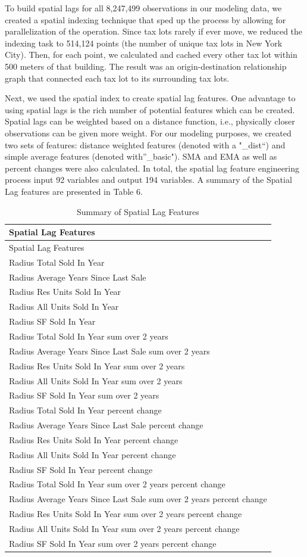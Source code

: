 \documentclass[12pt,]{article}
\begin{document}
To build spatial lags for all 8,247,499 observations in our modeling
data, we created a spatial indexing technique that sped up the process
by allowing for parallelization of the operation. Since tax lots rarely
if ever move, we reduced the indexing task to 514,124 points (the number
of unique tax lots in New York City). Then, for each point, we
calculated and cached every other tax lot within 500 meters of that
building. The result was an origin-destination relationship graph that
connected each tax lot to its surrounding tax lots.

Next, we used the spatial index to create spatial lag features. One
advantage to using spatial lags is the rich number of potential features
which can be created. Spatial lags can be weighted based on a distance
function, i.e., physically closer observations can be given more weight.
For our modeling purposes, we created two sets of features: distance
weighted features (denoted with a "\_dist``) and simple average features
(denoted with''\_basic"). SMA and EMA as well as percent changes were
also calculated. In total, the spatial lag feature engineering process
input 92 variables and output 194 variables. A summary of the Spatial
Lag features are presented in Table 6.

\begin{longtable}[]{@{}l@{}}
\caption{Summary of Spatial Lag Features}\tabularnewline
\toprule
Spatial Lag Features\tabularnewline
\midrule
\endfirsthead
\toprule
Spatial Lag Features\tabularnewline
\midrule
\endhead
Radius Total Sold In Year\tabularnewline
Radius Average Years Since Last Sale\tabularnewline
Radius Res Units Sold In Year\tabularnewline
Radius All Units Sold In Year\tabularnewline
Radius SF Sold In Year\tabularnewline
Radius Total Sold In Year sum over 2 years\tabularnewline
Radius Average Years Since Last Sale sum over 2 years\tabularnewline
Radius Res Units Sold In Year sum over 2 years\tabularnewline
Radius All Units Sold In Year sum over 2 years\tabularnewline
Radius SF Sold In Year sum over 2 years\tabularnewline
Radius Total Sold In Year percent change\tabularnewline
Radius Average Years Since Last Sale percent change\tabularnewline
Radius Res Units Sold In Year percent change\tabularnewline
Radius All Units Sold In Year percent change\tabularnewline
Radius SF Sold In Year percent change\tabularnewline
Radius Total Sold In Year sum over 2 years percent change\tabularnewline
Radius Average Years Since Last Sale sum over 2 years percent
change\tabularnewline
Radius Res Units Sold In Year sum over 2 years percent
change\tabularnewline
Radius All Units Sold In Year sum over 2 years percent
change\tabularnewline
Radius SF Sold In Year sum over 2 years percent change\tabularnewline
\bottomrule
\end{longtable}
\end{document}
